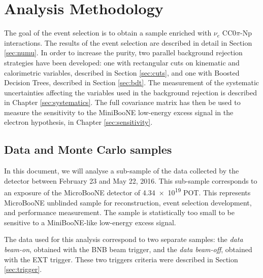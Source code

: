 \section{Analysis Methodology}
\label{sec:methodology}
The goal of the event selection is to obtain a sample enriched with $\nu_{e}$ CC0$\pi$-Np interactions. The results of the event selection are described in detail in Section \ref{sec:numu}. In order to increase the purity, two parallel background rejection strategies have been developed: one with rectangular cuts on kinematic and calorimetric variables, described in Section \ref{sec:cuts}, and one with Boosted Decision Trees, described in Section \ref{sec:bdt}.
The measurement of the systematic uncertainties affecting the variables used in the background rejection is described in Chapter \ref{sec:systematics}. The full covariance matrix has then be used to measure the sensitivity to the MiniBooNE low-energy excess signal in the electron hypothesis, in Chapter \ref{sec:sensitivity}.

\subsection{Data and Monte Carlo samples}\label{sec:data}
In this document, we will analyse a sub-sample of the data collected by the detector between February 23 and May 22, 2016. This sub-sample corresponds to an exposure of the MicroBooNE detector of \num{4.34e19} POT. This represents MicroBooNE unblinded sample for reconstruction, event selection development, and performance measurement. The sample is statistically too small to be sensitive to a MiniBooNE-like low-energy excess signal. 

The data used for this analysis correspond to two separate samples: the \emph{data beam-on}, obtained with the BNB beam trigger, and the \emph{data beam-off}, obtained with the EXT trigger. These two triggers criteria were described in Section \ref{sec:trigger}.

